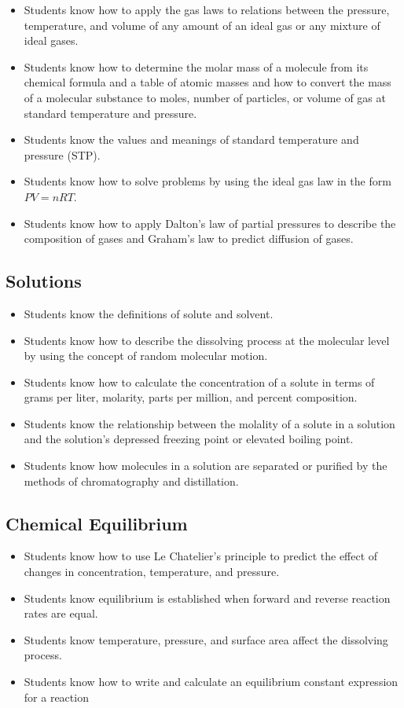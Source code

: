 \documentclass[12pt]{article}
\begin{document}
\begin{itemize}
    \item Students know how to apply the gas laws to relations between the pressure, temperature, and volume of any amount of an ideal gas or any mixture of ideal gases.
    \item Students know how to determine the molar mass of a molecule from its chemical formula and a table of atomic masses and how to convert the mass of a molecular substance to moles, number of particles, or volume of gas at standard temperature and pressure.
    \item Students know the values and meanings of standard temperature and pressure (STP).
    \item Students know how to solve problems by using the ideal gas law in the form $PV = nRT$.
    \item Students know how to apply Dalton's law of partial pressures to describe the composition of gases and Graham's law to predict diffusion of gases.
\end{itemize}

\subsection{Solutions}

\begin{itemize}
    \item Students know the definitions of solute and solvent.
    \item Students know how to describe the dissolving process at the molecular level by using the concept of random molecular motion.
    \item Students know how to calculate the concentration of a solute in terms of grams per liter, molarity, parts per million, and percent composition.
    \item Students know the relationship between the molality of a solute in a solution and the solution's depressed freezing point or elevated boiling point.
    \item Students know how molecules in a solution are separated or purified by the methods of chromatography and distillation.
\end{itemize}

\subsection{Chemical Equilibrium}

\begin{itemize}
    \item Students know how to use Le Chatelier's principle to predict the effect of changes in concentration, temperature, and pressure.
    \item Students know equilibrium is established when forward and reverse reaction rates are equal.
    \item Students know temperature, pressure, and surface area affect the dissolving process.
    \item Students know how to write and calculate an equilibrium constant expression for a reaction
\end{itemize}
\end{document}
